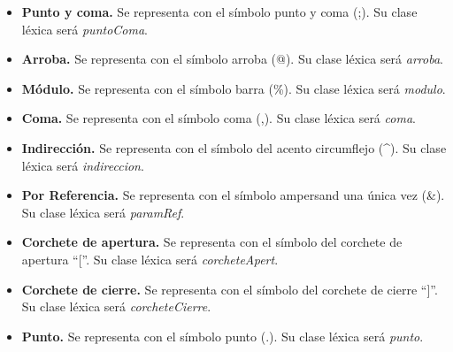 \begin{itemize}
    \item \textbf{Punto y coma.} Se representa con el símbolo punto y coma (;). Su clase léxica será \textit{puntoComa}.
    \item \textbf{Arroba.} Se representa con el símbolo arroba (@). Su clase léxica será \textit{arroba}.
    \item \textbf{Módulo.} Se representa con el símbolo barra (\%). Su clase léxica será \textit{modulo}.
    \item \textbf{Coma.} Se representa con el símbolo coma (,). Su clase léxica será \textit{coma}.
    \item \textbf{Indirección.} Se representa con el símbolo del acento circumflejo (\^{}). Su clase léxica será \textit{indireccion}.
    \item \textbf{Por Referencia.} Se representa con el símbolo ampersand una única vez (\&). Su clase léxica será \textit{paramRef}.
    \item \textbf{Corchete de apertura.} Se representa con el símbolo del corchete de apertura ``[''. Su clase léxica será \textit{corcheteApert}.
    \item \textbf{Corchete de cierre.} Se representa con el símbolo del corchete de cierre ``]''. Su clase léxica será \textit{corcheteCierre}.
    \item \textbf{Punto.} Se representa con el símbolo punto (.). Su clase léxica será \textit{punto}.
\end{itemize}
